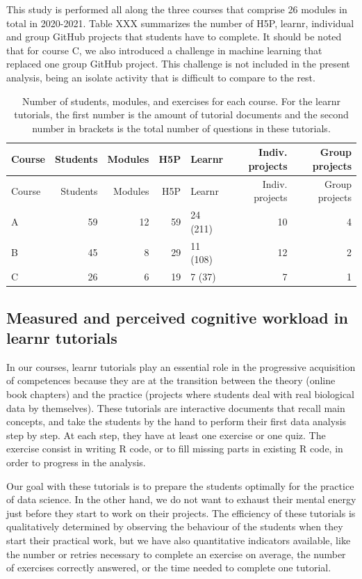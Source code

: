 \documentclass[
]{article}
\begin{document}
This study is performed all along the three courses that comprise 26
modules in total in 2020-2021. Table XXX summarizes the number of H5P,
learnr, individual and group GitHub projects that students have to
complete. It should be noted that for course C, we also introduced a
challenge in machine learning that replaced one group GitHub project.
This challenge is not included in the present analysis, being an isolate
activity that is difficult to compare to the rest.

\begin{longtable}[]{@{}lrrrlrr@{}}
\caption{Number of students, modules, and exercises for each course. For
the learnr tutorials, the first number is the amount of tutorial
documents and the second number in brackets is the total number of
questions in these tutorials.}\tabularnewline
\toprule
Course & Students & Modules & H5P & Learnr & Indiv. projects & Group
projects \\
\midrule
\endfirsthead
\toprule
Course & Students & Modules & H5P & Learnr & Indiv. projects & Group
projects \\
\midrule
\endhead
A & 59 & 12 & 59 & 24 (211) & 10 & 4 \\
B & 45 & 8 & 29 & 11 (108) & 12 & 2 \\
C & 26 & 6 & 19 & 7 (37) & 7 & 1 \\
\bottomrule
\end{longtable}

\hypertarget{measured-and-perceived-cognitive-workload-in-learnr-tutorials}{%
\subsection{Measured and perceived cognitive workload in learnr
tutorials}\label{measured-and-perceived-cognitive-workload-in-learnr-tutorials}}

In our courses, learnr tutorials play an essential role in the
progressive acquisition of competences because they are at the
transition between the theory (online book chapters) and the practice
(projects where students deal with real biological data by themselves).
These tutorials are interactive documents that recall main concepts, and
take the students by the hand to perform their first data analysis step
by step. At each step, they have at least one exercise or one quiz. The
exercise consist in writing R code, or to fill missing parts in existing
R code, in order to progress in the analysis.

Our goal with these tutorials is to prepare the students optimally for
the practice of data science. In the other hand, we do not want to
exhaust their mental energy just before they start to work on their
projects. The efficiency of these tutorials is qualitatively determined
by observing the behaviour of the students when they start their
practical work, but we have also quantitative indicators available, like
the number or retries necessary to complete an exercise on average, the
number of exercises correctly answered, or the time needed to complete
one tutorial.
\end{document}
